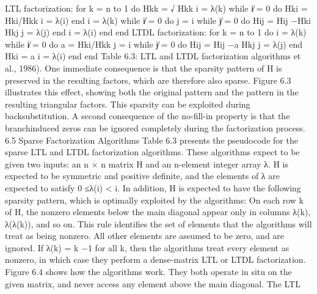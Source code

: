 LTL factorization: for k = n to 1 do Hkk = √ Hkk i = λ(k) while i̸ = 0 do Hki = Hki/Hkk i = λ(i) end i = λ(k) while i̸ = 0 do j = i while j̸ = 0 do Hij = Hij −Hki Hkj j = λ(j) end i = λ(i) end end LTDL factorization: for k = n to 1 do i = λ(k) while i̸ = 0 do a = Hki/Hkk j = i while j̸ = 0 do Hij = Hij −a Hkj j = λ(j) end Hki = a i = λ(i) end end Table 6.3: LTL and LTDL factorization algorithms et al., 1986). One immediate consequence is that the sparsity pattern of H is preserved in the resulting factors, which are therefore also sparse. Figure 6.3 illustrates this effect, showing both the original pattern and the pattern in the resulting triangular factors. This sparsity can be exploited during backsubstitution. A second consequence of the no-fill-in property is that the branchinduced zeros can be ignored completely during the factorization process. 6.5 Sparse Factorization Algorithms Table 6.3 presents the pseudocode for the sparse LTL and LTDL factorization algorithms. These algorithms expect to be given two inputs: an n × n matrix H and an n-element integer array λ. H is expected to be symmetric and positive definite, and the elements of λ are expected to satisfy 0 ≤λ(i) < i. In addition, H is expected to have the following sparsity pattern, which is optimally exploited by the algorithms: On each row k of H, the nonzero elements below the main diagonal appear only in columns λ(k), λ(λ(k)), and so on. This rule identifies the set of elements that the algorithms will treat as being nonzero. All other elements are assumed to be zero, and are ignored. If λ(k) = k −1 for all k, then the algorithms treat every element as nonzero, in which case they perform a dense-matrix LTL or LTDL factorization. Figure 6.4 shows how the algorithms work. They both operate in situ on the given matrix, and never access any element above the main diagonal. The LTL

